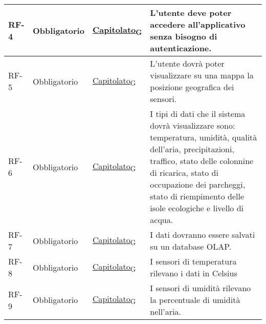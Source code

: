 \begin{longtable}{|>{\centering\arraybackslash}m{}|>{\centering\arraybackslash}m{}|>{\centering\arraybackslash}m{}|>{\centering\arraybackslash}m{}|}
	RF-4            & Obbligatorio        & \href{https://7last.github.io/docs/rtb/documentazione-interna/glossario\#capitolato}{Capitolato\textsubscript{G}}     & L'utente deve poter accedere all'applicativo senza bisogno di autenticazione.                                                                                                                                                                                                                           \\\hline
	RF-5            & Obbligatorio        & \href{https://7last.github.io/docs/rtb/documentazione-interna/glossario\#capitolato}{Capitolato\textsubscript{G}}     & L'utente dovrà poter visualizzare su una mappa la posizione geografica dei sensori.                                                                                                                                                                                                                     \\\hline
	RF-6            & Obbligatorio        & \href{https://7last.github.io/docs/rtb/documentazione-interna/glossario\#capitolato}{Capitolato\textsubscript{G}}     & I tipi di dati che il sistema dovrà visualizzare sono: temperatura, umidità, qualità dell'aria, precipitazioni, traffico, stato delle colonnine di ricarica, stato di occupazione dei parcheggi, stato di riempimento delle isole ecologiche e livello di acqua.                                        \\\hline
	RF-7            & Obbligatorio        & \href{https://7last.github.io/docs/rtb/documentazione-interna/glossario\#capitolato}{Capitolato\textsubscript{G}}     & I dati dovranno essere salvati su un database OLAP.                                                                                                                                                                                                                                                     \\\hline
	RF-8            & Obbligatorio        & \href{https://7last.github.io/docs/rtb/documentazione-interna/glossario\#capitolato}{Capitolato\textsubscript{G}}     & I sensori di temperatura rilevano i dati in Celsius                                                                                                                                                                                                                                                     \\\hline
	RF-9            & Obbligatorio        & \href{https://7last.github.io/docs/rtb/documentazione-interna/glossario\#capitolato}{Capitolato\textsubscript{G}}     & I sensori di umidità rilevano la percentuale di umidità nell’aria.                                                                                                                                                                                                                                      \\\hline

\end{longtable}
